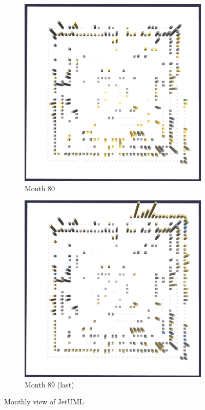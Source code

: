 \begin{figure}[t!]
    \medskip
    \begin{subfigure}{0.48\textwidth}
        \includegraphics[width=\linewidth]{JetUML_V2S5.png}
        \caption{Month 80} \label{fig:JetUML_V2S5}
    \end{subfigure}\hspace*{\fill}
    \begin{subfigure}{0.48\textwidth}
        \includegraphics[width=\linewidth]{JetUML_V2S6.png}
        \caption{Month 89 (last)} \label{fig:JetUML_V2S6}
    \end{subfigure}
    
    \caption{Monthly view of JetUML} 
    \label{fig:JetUML_V2}
\end{figure}
